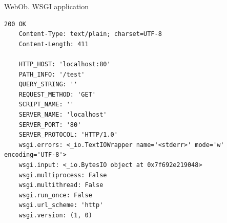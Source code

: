 \begin{frame}[fragile]{WebOb. WSGI application}

  \begin{lstlisting}[style=python]
    200 OK
    Content-Type: text/plain; charset=UTF-8
    Content-Length: 411

    HTTP_HOST: 'localhost:80'
    PATH_INFO: '/test'
    QUERY_STRING: ''
    REQUEST_METHOD: 'GET'
    SCRIPT_NAME: ''
    SERVER_NAME: 'localhost'
    SERVER_PORT: '80'
    SERVER_PROTOCOL: 'HTTP/1.0'
    wsgi.errors: <_io.TextIOWrapper name='<stderr>' mode='w' encoding='UTF-8'>
    wsgi.input: <_io.BytesIO object at 0x7f692e219048>
    wsgi.multiprocess: False
    wsgi.multithread: False
    wsgi.run_once: False
    wsgi.url_scheme: 'http'
    wsgi.version: (1, 0)
  \end{lstlisting}

\end{frame}


